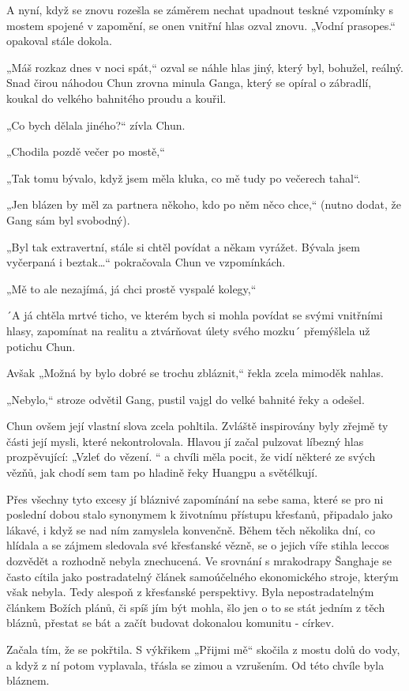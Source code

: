 A nyní, když se znovu rozešla se záměrem nechat upadnout teskné vzpomínky s mostem spojené v zapomění, se onen vnitřní hlas ozval znovu. „Vodní prasopes.“ opakoval stále dokola.

„Máš rozkaz dnes v noci spát,“ ozval se náhle hlas jiný, který byl, bohužel, reálný. Snad čirou náhodou Chun zrovna minula Ganga, který se opíral o zábradlí, koukal do velkého bahnitého proudu a kouřil.

„Co bych dělala jiného?“ zívla Chun.

„Chodila pozdě večer po mostě,“

„Tak tomu bývalo, když jsem měla kluka, co mě tudy po večerech tahal“.

„Jen blázen by měl za partnera někoho, kdo po něm něco chce,“ (nutno dodat, že Gang sám byl svobodný).

„Byl tak extravertní, stále si chtěl povídat a někam vyrážet. Bývala jsem vyčerpaná i beztak…“ pokračovala Chun ve vzpomínkách.

„Mě to ale nezajímá, já chci prostě vyspalé kolegy,“

´A já chtěla mrtvé ticho, ve kterém bych si mohla povídat se svými vnitřními hlasy, zapomínat na realitu a ztvárňovat úlety svého mozku´ přemýšlela už potichu Chun.

Avšak „Možná by bylo dobré se trochu zbláznit,“ řekla zcela mimoděk nahlas.

„Nebylo,“ stroze odvětil Gang, pustil vajgl do velké bahnité řeky a odešel.

Chun ovšem její vlastní slova zcela pohltila. Zvláště inspirovány byly zřejmě ty části její mysli, které nekontrolovala. Hlavou jí začal pulzovat líbezný hlas prozpěvující: „Vzleť do vězení. “ a chvíli měla pocit, že vidí některé ze svých vězňů, jak chodí sem tam po hladině řeky Huangpu a světélkují.

Přes všechny tyto excesy jí bláznivé zapomínání na sebe sama, které se pro ni poslední dobou stalo synonymem k životnímu přístupu křesťanů, připadalo jako lákavé, i když se nad ním zamyslela konvenčně. Během těch několika dní, co hlídala a se zájmem sledovala své křesťanské vězně, se o jejich víře stihla leccos dozvědět a rozhodně nebyla znechucená. Ve srovnání s mrakodrapy Šanghaje se často cítila jako postradatelný článek samoúčelného ekonomického stroje, kterým však nebyla. Tedy alespoň z křesťanské perspektivy. Byla nepostradatelným článkem Božích plánů, či spíš jím být mohla, šlo jen o to se stát jedním z těch bláznů, přestat se bát a začít budovat dokonalou komunitu - církev.

Začala tím, že se pokřtila. S výkřikem „Přijmi mě“ skočila z mostu dolů do vody, a když z ní potom vyplavala, třásla se zimou a vzrušením. Od této chvíle byla bláznem.
